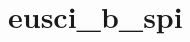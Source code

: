 \hypertarget{group__eusci__b__spi__api}{}\section{eusci\+\_\+b\+\_\+spi}
\label{group__eusci__b__spi__api}
